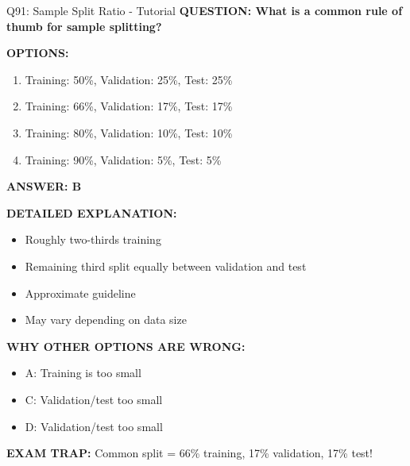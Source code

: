 \documentclass[8pt]{beamer}
\begin{document}
	\begin{frame}{Q91: Sample Split Ratio - Tutorial}
		\fontsize{6.5}{7.5}\selectfont
		\textbf{QUESTION: What is a common rule of thumb for sample splitting?}
		
		\vspace{0.1cm}
		\textbf{OPTIONS:}
		\begin{enumerate}
			\item Training: 50\%, Validation: 25\%, Test: 25\%
			\item Training: 66\%, Validation: 17\%, Test: 17\%
			\item Training: 80\%, Validation: 10\%, Test: 10\%
			\item Training: 90\%, Validation: 5\%, Test: 5\%
		\end{enumerate}
		
		\vspace{0.1cm}
		\textcolor{myblue}{\textbf{ANSWER: B}}
		
		\vspace{0.1cm}
		\textbf{DETAILED EXPLANATION:}
		\begin{itemize}
			\item Roughly two-thirds training
			\item Remaining third split equally between validation and test
			\item Approximate guideline
			\item May vary depending on data size
		\end{itemize}
		
		\vspace{0.1cm}
		\textcolor{myred}{\textbf{WHY OTHER OPTIONS ARE WRONG:}}
		\begin{itemize}
			\item \textcolor{myred}{A:} Training is too small
			\item \textcolor{myred}{C:} Validation/test too small
			\item \textcolor{myred}{D:} Validation/test too small
		\end{itemize}
		
		\textcolor{myred}{\textbf{EXAM TRAP:}} Common split = \textcolor{myblue}{66\% training, 17\% validation, 17\% test}!
	\end{frame}
	
\end{document}
